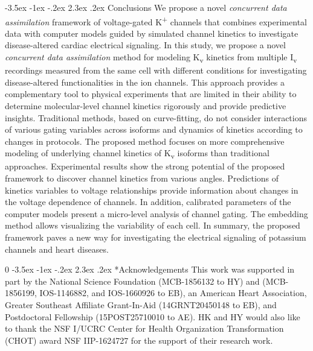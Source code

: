 \documentclass[11pt]{article}
\makeatletter
\newcommand{\blind}{0}
\renewcommand\section{\@startsection {section}{1}{\z@}%
                                   {-3.5ex \@plus -1ex \@minus -.2ex}%
                                   {2.3ex \@plus.2ex}%
                                   {\normalfont\fontfamily{phv}\fontsize{16}{19}\bfseries}}
\makeatother
\begin{document}
\section{Conclusions}\label{s:conclusions}
We propose a novel \textit{concurrent data assimilation} framework of voltage-gated K\textsuperscript{+} channels that combines experimental data with computer models guided by simulated channel kinetics to investigate disease-altered cardiac electrical signaling. In this study, we propose a novel \textit{concurrent data assimilation} method for modeling K\textsubscript{v} kinetics from multiple I\textsubscript{v} recordings measured from the same cell with different conditions for investigating disease-altered functionalities in the ion channels. This approach provides a complementary tool to physical experiments that are limited in their ability to determine molecular-level channel kinetics rigorously and provide predictive insights. Traditional methods, based on curve-fitting, do not consider interactions of various gating variables across isoforms and dynamics of kinetics according to changes in protocols. The proposed method focuses on more comprehensive modeling of underlying channel kinetics of K\textsubscript{v} isoforms than traditional approaches. Experimental results show the strong potential of the proposed framework to discover channel kinetics from various angles. Predictions of kinetics variables to voltage relationships provide information about changes in the voltage dependence of channels. In addition, calibrated parameters of the computer models present a micro-level analysis of channel gating. The embedding method allows visualizing the variability of each cell. In summary, the proposed framework paves a new way for investigating the electrical signaling of potassium channels and heart diseases. 

\blind{
\section*{Acknowledgements}
This work was supported in part by the National Science Foundation (MCB-1856132 to HY) and (MCB-1856199, IOS-1146882, and IOS-1660926 to EB), an American Heart Association, Greater Southeast Affiliate Grant-In-Aid (14GRNT20450148 to EB), and Postdoctoral Fellowship (15POST25710010 to AE). HK and HY would also like to thank the NSF I/UCRC Center for Health Organization Transformation (CHOT) award NSF IIP-1624727 for the support of their research work.
} \fi



	
\end{document}
